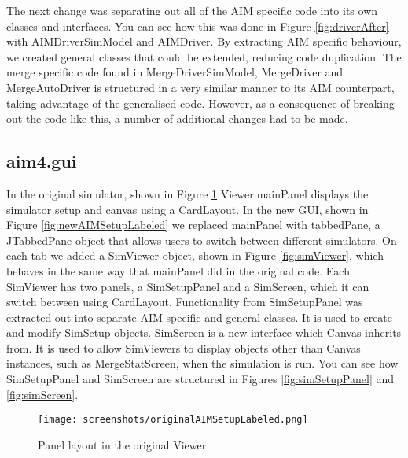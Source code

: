 The next change was separating out all of the AIM specific code into its own classes and interfaces. You can see how this was done in Figure \ref{fig:driverAfter} with AIMDriverSimModel and AIMDriver. By extracting AIM specific behaviour, we created general classes that could be extended, reducing code duplication. The merge specific code found in MergeDriverSimModel, MergeDriver and MergeAutoDriver is structured in a very similar manner to its AIM counterpart, taking advantage of the generalised code. However, as a consequence of breaking out the code like this, a number of additional changes had to be made. 


\subsection{aim4.gui}
\label{subsec:aim4.gui}
In the original simulator, shown in Figure \ref{fig:originalAIMSetupLabeled} Viewer.mainPanel displays the simulator setup and canvas using a CardLayout. In the new GUI, shown in Figure \ref{fig:newAIMSetupLabeled} we replaced mainPanel with tabbedPane, a JTabbedPane object that allows users to switch between different simulators. On each tab we added a SimViewer object, shown in Figure \ref{fig:simViewer}, which behaves in the same way that mainPanel did in the original code. Each SimViewer has two panels, a SimSetupPanel and a SimScreen, which it can switch between using CardLayout. Functionality from SimSetupPanel was extracted out into separate AIM specific and general classes. It is used to create and modify SimSetup objects. SimScreen is a new interface which Canvas inherits from. It is used to allow SimViewers to display objects other than Canvas instances, such as MergeStatScreen, when the simulation is run. You can see how SimSetupPanel and SimScreen are structured in Figures \ref{fig:simSetupPanel} and \ref{fig:simScreen}.

\begin{figure}[htb]
\texttt{[image: screenshots/originalAIMSetupLabeled.png]}
\caption{Panel layout in the original Viewer}
\label{fig:originalAIMSetupLabeled}
\end{figure}

